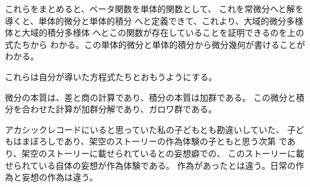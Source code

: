 \documentclass{jsarticle}
\begin{document}
   これらをまとめると、ベータ関数を単体的関数として、
   これを常微分へと解を導くと、単体的微分と単体的積分
   へと定義できて、これより、大域的微分多様体と大域的積分多様体
   へとこの関数が存在していることを証明できるのを上の式たちから
   わかる。この単体的微分と単体的積分から微分幾何が書けることがわかる。

   
   これらは自分が導いた方程式たちとおもうようにする。

   
   微分の本質は、差と商の計算であり、積分の本質は加群である。
   この微分と積分を合わせた計算が加群分解であり、ガロワ群である。

   アカシックレコードにいると思っていた私の子どもとも勘違いしていた、
   子どもはまぼろしであり、架空のストーリーの作為体験の子ともと思う次第
   であり、架空のストーリーに載せられているとの妄想癖での、
   このストーリーに載せられている自体の妄想が作為体験である。
   作為があったとは違う。日常の作為と妄想の作為は違う。
\end{document}
